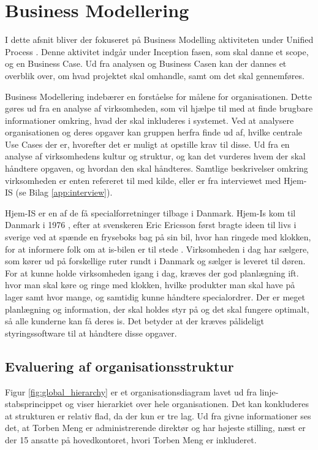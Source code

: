 \chapter{Business Modellering}\label{ch:businessanalysis}
I dette afsnit bliver der fokuseret på Business Modelling aktiviteten under Unified Process \cite{UnifiedProcess}. Denne aktivitet indgår under Inception fasen, som skal danne et scope, og en Business Case\cite{ProjectManagement}. Ud fra analysen og Business Casen kan der dannes et overblik over, om hvad projektet skal omhandle, samt om det skal gennemføres. %

Business Modellering indebærer en forståelse for målene for organisationen. Dette gøres ud fra en analyse af virksomheden, som vil hjælpe til med at finde brugbare informationer omkring, hvad der skal inkluderes i systemet\cite{UP}. Ved at analysere organisationen og deres opgaver kan gruppen herfra finde ud af, hvilke centrale Use Cases der er, hvorefter det er muligt at opstille krav til disse. Ud fra en analyse af virksomhedens kultur og struktur, og kan det vurderes hvem der skal håndtere opgaven, og hvordan den skal håndteres. Samtlige beskrivelser omkring virksomheden er enten refereret til med kilde, eller er fra interviewet med Hjem-IS (se Bilag \ref{app:interview}).

Hjem-IS er en af de få specialforretninger tilbage i Danmark. Hjem-Is kom til Danmark i 1976 \cite{Hjemisabout}, efter at svenskeren Eric Ericsson først bragte ideen til livs i sverige ved at spænde en fryseboks bag på sin bil, hvor han ringede med klokken, for at informere folk om at is-bilen er til stede \cite{Hjemisabout}. Virksomheden i dag har sælgere, som kører ud på forskellige ruter rundt i Danmark og sælger is leveret til døren. For at kunne holde virksomheden igang i dag, kræves der god planlægning ift. hvor man skal køre og ringe med klokken, hvilke produkter man skal have på lager samt hvor mange, og samtidig kunne håndtere specialordrer. Der er meget planlægning og information, der skal holdes styr på og det skal fungere optimalt, så alle kunderne kan få deres is. Det betyder at der kræves pålideligt styringssoftware til at håndtere disse opgaver. 

\section{Evaluering af organisationsstruktur}
Figur \ref{fig:global_hierarchy} er et organisationsdiagram lavet ud fra linje-stabsprincippet \cite{Organisation} og viser hierarkiet over hele organisationen. Det kan konkluderes at strukturen er relativ flad, da der kun er tre lag. Ud fra givne informationer ses det, at Torben Meng er administrerende direktør og har højeste stilling, næst er der 15 ansatte på hovedkontoret, hvori Torben Meng er inkluderet.

